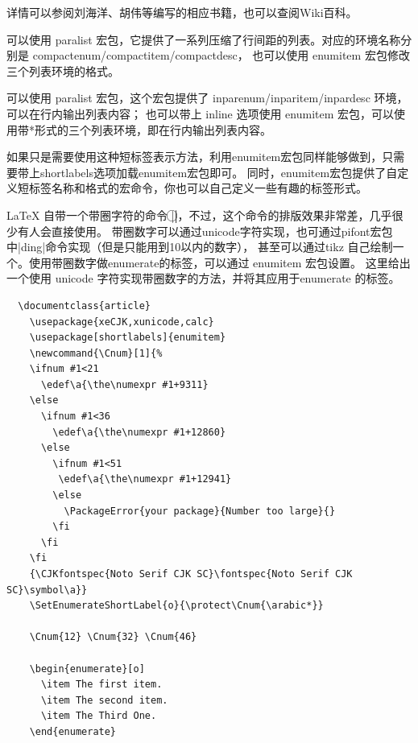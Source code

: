 详情可以参阅刘海洋、胡伟等编写的相应书籍，也可以查阅Wiki百科。



可以使用 paralist 宏包，它提供了一系列压缩了行间距的列表。对应的环境名称分别是 compactenum/compactitem/compactdesc，
也可以使用 enumitem 宏包修改三个列表环境的格式。



可以使用 paralist 宏包，这个宏包提供了 inparenum/inparitem/inpardesc 环境，可以在行内输出列表内容；
也可以带上 inline 选项使用 enumitem 宏包，可以使用带*形式的三个列表环境，即在行内输出列表内容。



如果只是需要使用这种短标签表示方法，利用enumitem宏包同样能够做到，只需要带上shortlabels选项加载enumitem宏包即可。
同时，enumitem宏包提供了自定义短标签名称和格式的宏命令，你也可以自己定义一些有趣的标签形式。



\LaTeX{} 自带一个带圈字符的命令 |\textcircled|，不过，这个命令的排版效果非常差，几乎很少有人会直接使用。
带圈数字可以通过unicode字符实现，也可通过pifont宏包中|ding|命令实现（但是只能用到10以内的数字），
甚至可以通过tikz 自己绘制一个。使用带圈数字做enumerate的标签，可以通过 enumitem 宏包设置。
这里给出一个使用 unicode 字符实现带圈数字的方法，并将其应用于enumerate 的标签。

\begin{verbatim}
  \documentclass{article}
    \usepackage{xeCJK,xunicode,calc}
    \usepackage[shortlabels]{enumitem}
    \newcommand{\Cnum}[1]{%
    \ifnum #1<21
      \edef\a{\the\numexpr #1+9311}
    \else
      \ifnum #1<36
        \edef\a{\the\numexpr #1+12860}
      \else
        \ifnum #1<51
         \edef\a{\the\numexpr #1+12941}
        \else
          \PackageError{your package}{Number too large}{}
        \fi
      \fi
    \fi
    {\CJKfontspec{Noto Serif CJK SC}\fontspec{Noto Serif CJK SC}\symbol\a}}
    \SetEnumerateShortLabel{o}{\protect\Cnum{\arabic*}}
    
    \Cnum{12} \Cnum{32} \Cnum{46} 
    
    \begin{enumerate}[o]
      \item The first item.
      \item The second item.
      \item The Third One.
    \end{enumerate}
    
\end{verbatim}


